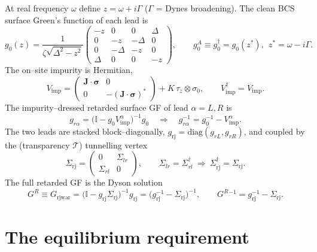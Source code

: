 \documentclass[11pt]{article}
\newcommand{\GR}{G^{R}}
\newcommand{\gz}{g_{0}}
\newcommand{\tz}{\tau_{z}}
\newcommand{\Vimp}{V_{\mathrm{imp}}}
\newcommand{\dg}{^{\dagger}}
\begin{document}
At real frequency $\omega$ define $z=\omega+i\Gamma$ ($\Gamma$ = Dynes broadening).
The clean BCS surface Green's function of each lead is
\begin{equation}
  \gz(z)=\frac{1}{\zeta\sqrt{\Delta^{2}-z^{2}}}
  \begin{pmatrix}
    -z & 0 & 0 & \Delta\\
    0 & -z & -\Delta & 0\\
    0 & -\Delta & -z & 0\\
    \Delta & 0 & 0 & -z
  \end{pmatrix},
  \qquad
  \gz^{A}\equiv \gz\dg=\gz(z^{*}),\ \ z^{*}=\omega-i\Gamma .
\end{equation}
The on--site impurity is Hermitian,
\begin{equation}
  \Vimp=\begin{pmatrix}\mathbf{J}\!\cdot\!\boldsymbol\sigma & 0\\[2pt]
        0 & -(\mathbf{J}\!\cdot\!\boldsymbol\sigma)^{*}\end{pmatrix}
        + K\,\tz\!\otimes\!\sigma_{0},
  \qquad \Vimp\dg=\Vimp .
\end{equation}
The impurity--dressed retarded surface GF of lead $\alpha=L,R$ is
\begin{equation}
  g_{r\alpha}=\bigl(\mathbb{I}-\gz\Vimp^{\alpha}\bigr)^{-1}\gz
  \quad\Longrightarrow\quad
  g_{r\alpha}^{-1}=\gz^{-1}-\Vimp^{\alpha}.
  \label{eq:grinv}
\end{equation}
The two leads are stacked block--diagonally, $g_{\mathrm{rj}}=\mathrm{diag}(g_{rL},g_{rR})$,
and coupled by the (transparency $\mathcal T$) tunnelling vertex
\begin{equation}
  \Sigma_{\mathrm{rj}}=\begin{pmatrix}0 & \Sigma_{lr}\\ \Sigma_{rl} & 0\end{pmatrix},
  \qquad \Sigma_{lr}=\Sigma_{rl}\dg
  \ \Longrightarrow\ \Sigma_{\mathrm{rj}}\dg=\Sigma_{\mathrm{rj}} .
  \label{eq:tunnelherm}
\end{equation}
The full retarded GF is the Dyson solution
\begin{equation}
  \GR\equiv G_{\mathrm{rjwar}}
  =\bigl(\mathbb{I}-g_{\mathrm{rj}}\Sigma_{\mathrm{rj}}\bigr)^{-1}g_{\mathrm{rj}}
  =\bigl(g_{\mathrm{rj}}^{-1}-\Sigma_{\mathrm{rj}}\bigr)^{-1},
  \qquad
  \GR{}^{-1}=g_{\mathrm{rj}}^{-1}-\Sigma_{\mathrm{rj}} .
  \label{eq:Ginv}
\end{equation}

\section{The equilibrium requirement}
\end{document}
